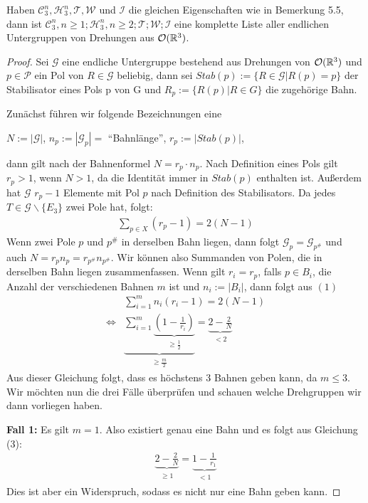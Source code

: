 \begin{theorem}
 Haben $\mathcal{C}^n_3,\mathcal{H}^n_3,\mathcal{T},\mathcal{W}$ und $\mathcal{I}$ die gleichen Eigenschaften wie in Bemerkung 5.5, dann ist $\mathcal{C}^n_3,n\geq1;\mathcal{H}^n_3,n\geq2;\mathcal{T};\mathcal{W};\mathcal{I}$ eine komplette Liste aller endlichen Untergruppen von Drehungen aus ${\mathcal{O}(\mathbb{R}^3)}$.
\end{theorem}
\begin{proof}
 Sei $\mathcal{G}$ eine endliche Untergruppe bestehend aus Drehungen von ${\mathcal{O}(\mathbb{R}^3)}$ und $p \in \mathcal{P}$ ein Pol von $R \in \mathcal{G}$ beliebig, dann sei $Stab(p) := \{R\in \mathcal{G} | R(p)=p\}$ der Stabilisator eines Pols p von G und $R_p := \{R(p) | R \in G \}$ die zugehörige Bahn.
 
 Zunächst führen wir folgende Bezeichnungen eine
 \begin{center}
  $N:=|\mathcal{G}|$, $n_p:=|\mathcal{G}_p|=$ "`Bahnlänge"', $r_p:=|Stab(p)|$,
 \end{center}
dann gilt nach der Bahnenformel $N=r_p \cdot n_p$. Nach Definition eines Pols gilt $r_p > 1$, wenn $N > 1$, da die Identität immer in $Stab(p)$ enthalten ist. Außerdem hat $\mathcal{G}$ $r_p - 1$ Elemente mit Pol $p$ nach Definition des Stabilisators. Da jedes $T \in \mathcal{G}\backslash\{E_3\}$ zwei Pole hat, folgt:
\setcounter{equation}{0}
\begin{align}
 \sum_{p \in X}(r_p - 1)= 2(N-1)
\end{align}
Wenn zwei Pole $p$ und $p^{\#}$ in derselben Bahn liegen, dann folgt $\mathcal{G}_p=\mathcal{G}_{p^{\#}}$ und auch $N=r_p n_p=r_{p^{\#}} n_{p^{\#}}$. Wir können also Summanden von Polen, die in derselben Bahn liegen zusammenfassen. Wenn gilt $r_i=r_p$, falls $p\in B_i$, die Anzahl der verschiedenen Bahnen $m$ ist und $n_i:=|B_i|$, dann folgt aus $(1)$
\begin{align}
 &\sum_{i=1}^m n_i(r_i-1)=2(N-1) \\
 \Leftrightarrow &\underbrace{\sum_{i=1}^m \underbrace{(1-\frac{1}{r_i})}_{\substack{\geq \frac{1}{2}}}}_{\substack{\geq \frac{m}{2}}}=\underbrace{2-\frac{2}{N}}_{\substack{<2}}
\end{align}
Aus dieser Gleichung folgt, dass es höchstens 3 Bahnen geben kann, da $m \leq 3$. Wir möchten nun die drei Fälle überprüfen und schauen welche Drehgruppen wir dann vorliegen haben.

\textbf{Fall 1:} Es gilt $m=1$. Also existiert genau eine Bahn und es folgt aus Gleichung (3):
\begin{align*}
 \underbrace{2-\frac{2}{N}}_{\substack{\geq 1}} = \underbrace{1-\frac{1}{r_1}}_{\substack{<1}}
\end{align*}
Dies ist aber ein Widerspruch, sodass es nicht nur eine Bahn geben kann.


\end{proof}

